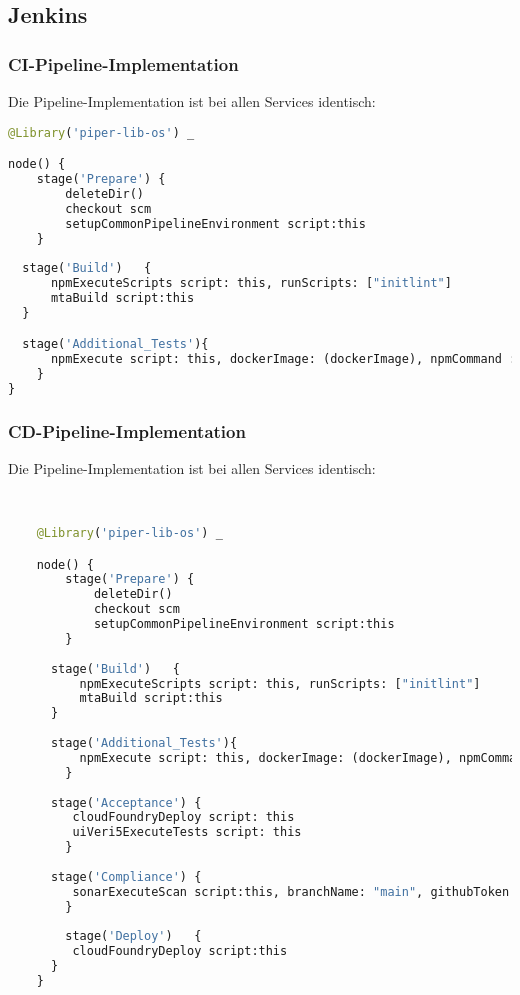\subsection{Jenkins}
\subsubsection{CI-Pipeline-Implementation}
Die Pipeline-Implementation ist bei allen Services identisch:\\
\begin{lstlisting}[language=Python, breaklines=true, basicstyle=\small\ttfamily, frame=single]
@Library('piper-lib-os') _

node() {
    stage('Prepare') {
        deleteDir()
        checkout scm
        setupCommonPipelineEnvironment script:this
    }
	
  stage('Build')   {
      npmExecuteScripts script: this, runScripts: ["initlint"]
      mtaBuild script:this  
  }

  stage('Additional_Tests'){
      npmExecute script: this, dockerImage: (dockerImage), npmCommand : "run mykarma:ci"
    }
}
        \end{lstlisting}



\subsubsection{CD-Pipeline-Implementation}
Die Pipeline-Implementation ist bei allen Services identisch:\\
\begin{lstlisting}[language=Python, breaklines=true, basicstyle=\small\ttfamily, frame=single]


    @Library('piper-lib-os') _

    node() {
        stage('Prepare') {
            deleteDir()
            checkout scm
            setupCommonPipelineEnvironment script:this
        }
        
      stage('Build')   {
          npmExecuteScripts script: this, runScripts: ["initlint"]
          mtaBuild script:this  
      }
    
      stage('Additional_Tests'){
          npmExecute script: this, dockerImage: (dockerImage), npmCommand : "run mykarma:ci"
        }
    
      stage('Acceptance') {
         cloudFoundryDeploy script: this
         uiVeri5ExecuteTests script: this
        }
        
      stage('Compliance') {
         sonarExecuteScan script:this, branchName: "main", githubToken: (githubToken), token:(Token), serverUrl: (serverUrl)
        }
        
        stage('Deploy')   {
         cloudFoundryDeploy script:this
      }
    }
    
        \end{lstlisting}
